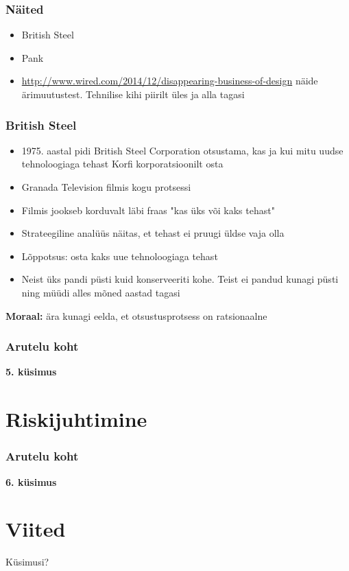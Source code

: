 \begin{frame}[fragile]
  \frametitle{Näited}
	\begin{itemize}
		\item British Steel
		\item Pank
		\item \url{http://www.wired.com/2014/12/disappearing-business-of-design} näide ärimuutustest. Tehnilise kihi piirilt üles ja alla tagasi
	\end{itemize}
\end{frame}

\begin{frame}[fragile]
  \frametitle{British Steel}
	\begin{itemize}
		\item 1975. aastal pidi British Steel Corporation otsustama, kas ja kui mitu uudse tehnoloogiaga tehast Korfi korporatsioonilt osta 
		\item Granada Television filmis kogu protsessi
		\item Filmis jookseb korduvalt läbi fraas "kas üks või kaks tehast"
		\item Strateegiline analüüs näitas, et tehast ei pruugi üldse vaja olla
		\item Lõppotsus: osta kaks uue tehnoloogiaga tehast
		\item Neist üks pandi püsti kuid konserveeriti kohe. Teist ei pandud kunagi püsti ning müüdi alles mõned aastad tagasi
	\end{itemize}
	\begin{center}
		\textbf{Moraal:} ära kunagi eelda, et otsustusprotsess on ratsionaalne
	\end{center}
\end{frame}


\begin{frame}[fragile]
  \frametitle{Arutelu koht}
		\begin{center}
			\textbf{5. küsimus}
		\end{center}
\end{frame}

\section{Riskijuhtimine}
\begin{frame}[fragile]
  \frametitle{Arutelu koht}
		\begin{center}
			\textbf{6. küsimus}
		\end{center}
\end{frame}


\section{Viited}

\begin{frame}[t,allowframebreaks,]
  	
	 

\end{frame}

\begin{frame}[plain]
	\begin{center}Küsimusi?\end{center}
\end{frame}


